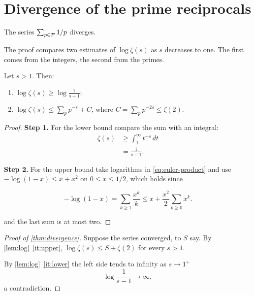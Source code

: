 \section{Divergence of the prime reciprocals}\label{sec:divergence}

\begin{thm}\label{thm:divergence}
The series $\sum_{p \in \mathcal{P}} 1/p$ diverges.
\end{thm}

The proof compares two estimates of $\log \zeta(s)$ as $s$ decreases to
one. The first comes from the integers, the second from the primes.

\begin{lem}\label{lem:log}
Let $s > 1$. Then:
\begin{enumerate}
  \item\label{it:lower} $\log \zeta(s) \ge \log \frac{1}{s-1}$;
  \item\label{it:upper} $\log \zeta(s) \le \sum_{p} p^{-s} + C$, where
  $C = \sum_p p^{-2s} \le \zeta(2)$.
\end{enumerate}
\end{lem}

\begin{proof}
\textbf{Step 1.} For the lower bound compare the sum with an integral:
\begin{align}
  \zeta(s) &\ge \int_1^\infty t^{-s}\,dt \label{eq:integral}\\
           &= \frac{1}{s-1}. \label{eq:integral-value}
\end{align}

\textbf{Step 2.} For the upper bound take logarithms in
\cref{eq:euler-product} and use $-\log(1-x) \le x + x^2$ on
$0 \le x \le 1/2$, which holds since

\[
  -\log(1-x) = \sum_{k \ge 1} \frac{x^k}{k}
    \le x + \frac{x^2}{2} \sum_{k \ge 0} x^k.
\]

and the last sum is at most two.
\end{proof}

\begin{proof}[Proof of \cref{thm:divergence}]
Suppose the series converged, to $S$ say. By \cref{lem:log}~\ref{it:upper},
$\log \zeta(s) \le S + \zeta(2)$ for every $s > 1$.

By
\cref{lem:log}~\ref{it:lower} the left side tends to infinity as
$s \to 1^+$
\[
  \log \frac{1}{s-1} \to \infty,
\]
a contradiction.
\end{proof}


